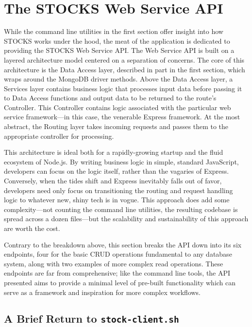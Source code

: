 \documentclass[
11pt,
titlepage,
]{article}
\begin{document}
\section{The STOCKS Web Service API}

While the command line utilities in the first section offer insight into how
STOCKS works under the hood, the meat of the application is dedicated to
providing the STOCKS Web Service API. The Web Service API is built on a layered
architecture model centered on a separation of concerns. The core of this
architecture is the Data Access layer, described in part in the first section,
which wraps around the MongoDB driver methods. Above the Data Access layer, a
Services layer contains business logic that processes input data before passing
it to Data Access functions and output data to be returned to the route's
Controller. This Controller contains logic associated with the particular web
service framework---in this case, the venerable Express framework. At the most
abstract, the Routing layer takes incoming requests and passes them to the
appropriate controller for processing.

This architecture is ideal both for a rapidly-growing startup and the fluid
ecosystem of Node.js. By writing business logic in simple, standard JavaScript,
developers can focus on the logic itself, rather than the vagaries of Express.
Conversely, when the tides shift and Express inevitably falls out of favor,
developers need only focus on transitioning the routing and request handling
logic to whatever new, shiny tech is in vogue. This approach does add some
complexity---not counting the command line utilities, the resulting codebase is
spread across a dozen files---but the scalability and sustainability of this
approach are worth the cost.

Contrary to the breakdown above, this section breaks the API down into its six
endpoints, four for the basic CRUD operations fundamental to any database
system, along with two examples of more complex read operations. These endpoints
are far from comprehensive; like the command line tools, the API presented aims
to provide a minimal level of pre-built functionality which can serve as a
framework and inspiration for more complex workflows.

\subsection{A Brief Return to \texttt{stock-client.sh}}
\end{document}
